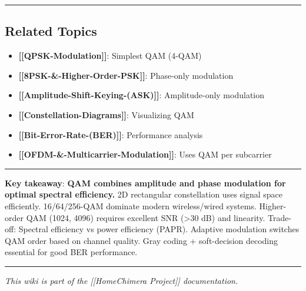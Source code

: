 \begin{center}\rule{0.5\linewidth}{0.5pt}\end{center}

\subsection{Related Topics}\label{related-topics}

\begin{itemize}
\tightlist
\item
  \textbf{{[}{[}QPSK-Modulation{]}{]}}: Simplest QAM (4-QAM)
\item
  \textbf{{[}{[}8PSK-\&-Higher-Order-PSK{]}{]}}: Phase-only modulation
\item
  \textbf{{[}{[}Amplitude-Shift-Keying-(ASK){]}{]}}: Amplitude-only
  modulation
\item
  \textbf{{[}{[}Constellation-Diagrams{]}{]}}: Visualizing QAM
\item
  \textbf{{[}{[}Bit-Error-Rate-(BER){]}{]}}: Performance analysis
\item
  \textbf{{[}{[}OFDM-\&-Multicarrier-Modulation{]}{]}}: Uses QAM per
  subcarrier
\end{itemize}

\begin{center}\rule{0.5\linewidth}{0.5pt}\end{center}

\textbf{Key takeaway}: \textbf{QAM combines amplitude and phase
modulation for optimal spectral efficiency.} 2D rectangular
constellation uses signal space efficiently. 16/64/256-QAM dominate
modern wireless/wired systems. Higher-order QAM (1024, 4096) requires
excellent SNR (\textgreater30 dB) and linearity. Trade-off: Spectral
efficiency vs power efficiency (PAPR). Adaptive modulation switches QAM
order based on channel quality. Gray coding + soft-decision decoding
essential for good BER performance.

\begin{center}\rule{0.5\linewidth}{0.5pt}\end{center}

\emph{This wiki is part of the {[}{[}Home\textbar Chimera Project{]}{]}
documentation.}

